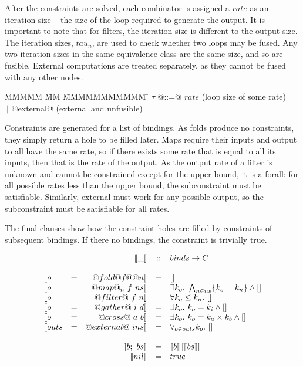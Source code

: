 After the constraints are solved, each combinator is assigned a $rate$ as an iteration size -- the size of the loop required to generate the output.
It is important to note that for filters, the iteration size is different to the output size.
The iteration sizes, $tau_n$, are used to check whether two loops may be fused.
Any two iteration sizes in the same equivalence class are the same size, and so are fusible.
External computations are treated separately, as they cannot be fused with any other nodes.

\begin{tabbing}
MMMMM       \= MM \= MMMMMMMMMMM \= \kill
$\tau$       \> @::=@ \> $rate$                                  \> (loop size of some rate) \\
             \> $~|$  \> @external@                              \> (external and unfusible) \\
\end{tabbing}


Constraints are generated for a list of bindings.
As folds produce no constraints, they simply return a hole to be filled later.
Maps require their inputs and output to all have the same rate, so if there exists some rate that is equal to all its inputs, then that is the rate of the output.
As the output rate of a filter is unknown and cannot be constrained except for the upper bound, it is a forall: for all possible rates less than the upper bound, the subconstraint must be satisfiable.
Similarly, external must work for any possible output, so the subconstraint must be satisfiable for all rates.

The final clauses show how the constraint holes are filled by constraints of subsequent bindings.
If there no bindings, the constraint is trivially true.

$$\begin{array}{lcrcl}
&&\constr{\_} & :: & binds \rightarrow C \\
\\

\constr{o &=& @fold @f@ @n}       &  = &  \hole \\
\constr{o &=& @map@_n~f~ns}       &  = &  \exists k_o.\ \bigwedge_{n \in ns}\{k_o = k_n\} \wedge \hole \\
\constr{o &=& @filter@~f~n}       &  = &  \forall k_o \le k_n.\ \hole \\
\constr{o &=& @gather@~i~d}       &  = &  \exists k_o.\ k_o = k_i \wedge \hole \\
\constr{o &=& @cross@~a~b}        &  = &  \exists k_o.\ k_o = k_a \times k_b \wedge \hole \\
\constr{outs &=& @external@~ins}  &  = &  \forall_{o \in outs} k_o.\ \hole \\
\\
&&\constr{b;~bs}  &  = &  \fillhole{\constr{b}}{\constr{bs}}       \\
&&\constr{nil}    &  = &  true                          \\
\end{array}$$

